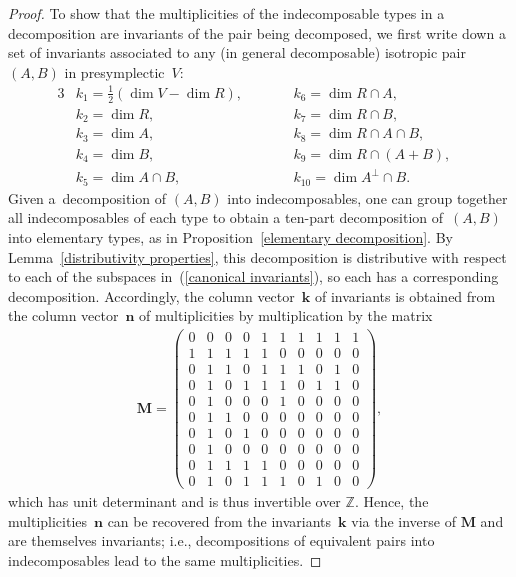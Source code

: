 \documentclass[10pt,a4paper]{amsart}
\numberwithin{equation}{section}
\begin{document}
\begin{proof}
To show that the multiplicities of the indecomposable types in a decomposition are invariants of the pair being decomposed, we f\/irst write down a set of invariants associated to any (in general decomposable) isotropic pair $(A,B)$ in presymplectic~$V$:
\begin{alignat}{3}
&k_1 = \tfrac{1}{2}(\dim V-\dim R),\qquad  && k_6 = \dim R \cap A, &\nonumber  \\
&k_2 = \dim R,\qquad  && k_7 = \dim R \cap B, &\nonumber  \\
&k_3 =  \dim A,\qquad  && k_8 = \dim R \cap A \cap B, &  \label{canonical invariants}\\
&k_4 =  \dim B,\qquad  && k_9 = \dim R \cap (A + B), &\nonumber  \\
&k_5 =  \dim A  \cap B,\qquad  &&   k_{10} = \dim A^{\perp} \cap B. &\nonumber
\end{alignat}
Given  a~decomposition of $(A,B)$ into indecomposables, one can group together all indecomposables of each type to obtain a ten-part decomposition of~$(A,B)$ into elementary types, as in Proposition~\ref{elementary decomposition}. By Lemma~\ref{distributivity properties}, this decomposition is distributive with respect to each of the subspaces in~(\ref{canonical invariants}), so each has a corresponding decomposition. Accordingly, the column vector~$\textbf{k}$ of invariants is obtained from the column vector~$\textbf{n}$ of multiplicities by multiplication by the matrix
\begin{gather*}
{\mathbf M} =
\left(
\begin{matrix}
0 & 0 & 0 & 0 & 1 & 1 & 1 & 1 & 1 & 1 \\
1 & 1 & 1 & 1 & 1 & 0 & 0 & 0 & 0 & 0 \\
0 & 1 & 1 & 0 & 1 & 1 & 1 & 0 & 1 & 0 \\
0 & 1 & 0 & 1 & 1 & 1 & 0 & 1 & 1 & 0 \\
0 & 1 & 0 & 0 & 0 & 1 & 0 & 0 & 0 & 0 \\
0 & 1 & 1 & 0 & 0 & 0 & 0 & 0 & 0 & 0 \\
0 & 1 & 0 & 1 & 0 & 0 & 0 & 0 & 0 & 0 \\
0 & 1 & 0 & 0 & 0 & 0 & 0 & 0 & 0 & 0 \\
0 & 1 & 1 & 1 & 1 & 0 & 0 & 0 & 0 & 0 \\
0 & 1 & 0 & 1 & 1 & 1 & 0 & 1 & 0 & 0
\end{matrix}
\right),
\end{gather*}
which has unit determinant and is thus invertible over $\mathbb{Z}$. Hence, the multiplicities~$\textbf{n}$ can be recovered from the invariants~$\textbf{k}$ via the inverse of $\mathbf{M}$ and are themselves invariants; i.e., decompositions of equivalent pairs into indecomposables lead to the same multiplicities.
\end{proof}
\end{document}
